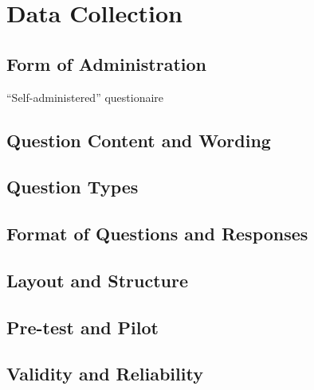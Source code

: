 \section{Data Collection}

  \subsection{Form of Administration}

    ``Self-administered'' questionaire

  \subsection{Question Content and Wording}

  \subsection{Question Types}

  \subsection{Format of Questions and Responses}

  \subsection{Layout and Structure}

  \subsection{Pre-test and Pilot}

  \subsection{Validity and Reliability}




% 